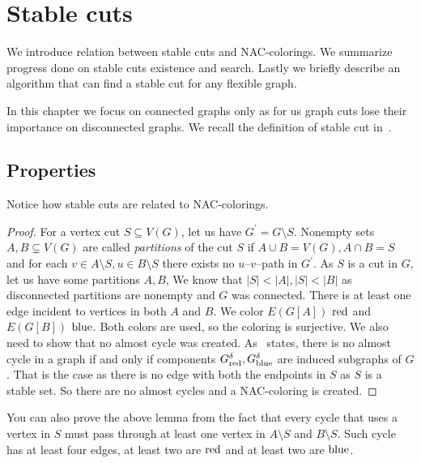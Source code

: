 
\chapter{Stable cuts}%
\label{chapter:stable_cuts}

\begin{chapterabstract}
	We introduce relation between stable cuts and NAC-colorings.
	We summarize progress done on stable cuts existence and search.
	Lastly we briefly describe an algorithm that can find a stable cut
	for any flexible graph.
\end{chapterabstract}


In this chapter we focus on connected graphs only as for us graph cuts
lose their importance on disconnected graphs.
We recall the definition of
stable cut in~.

\section{Properties}

Notice how stable cuts are related to NAC-colorings.
%
%
\begin{proof}
	For a vertex cut \( S \subseteq V(G) \), let us have \( G^\prime = G \setminus S \).
	Nonempty sets \( A, B \subsetneq V(G) \) are called \emph{partitions} of the cut \( S \)
	if \( A \cup B = V(G), A \cap B = S \) and for each \( v \in A \setminus S, u \in B \setminus S \)
	there exists no \( u \)--\( v \)--path in \( G^\prime \).
	As \( S \) is a cut in \( G \), let us have some partitions \( A, B \),
	We know that \( |S| < |A|, |S| < |B| \)
	as disconnected partitions are nonempty and \( G \) was connected.
	There is at least one edge incident to vertices in both \( A \) and \( B \).
	We color \( E(G[A]) \) \( \text{red} \) and \( E(G[B]) \) \( \text{blue} \).
	Both colors are used, so the coloring is surjective.
	We also need to show that no almost cycle was created.
	As~
	states, there is no almost cycle in a graph if and only
	if components \( G_{\text{red}}^\delta, G_{\text{blue}}^\delta \)
	are induced subgraphs of \( G \).
	That is the case as there is no edge with both the endpoints in \( S \)
	as \( S \) is a stable set.
	So there are no almost cycles and a NAC-coloring is created.
\end{proof}
%
You can also prove the above lemma from the fact that every cycle that
uses a vertex in \( S \) must pass
through at least one vertex in \( A \setminus S \) and \( B \setminus S \).
Such cycle has at least four edges,
at least two are \( \text{red} \) and at least two are \( \text{blue} \).

